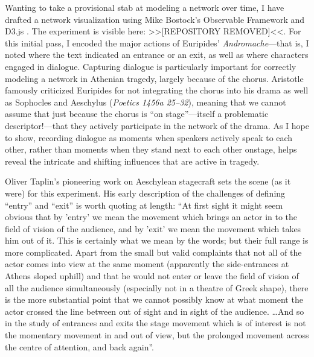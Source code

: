 \documentclass{jcls}
\begin{document}
Wanting to take a provisional stab at modeling a network over time, I
have drafted a network visualization using Mike Bostock's Observable
Framework and D3.js \cite{Observable2025, Bostock2025}. The
experiment is visible here:
>>[REPOSITORY REMOVED]<<.
For this initial pass, I encoded the major actions of Euripides'
\textit{Andromache}---that is, I noted where the text indicated an
entrance or an exit, as well as where characters engaged in dialogue.
Capturing dialogue is particularly important for correctly modeling a
network in Athenian tragedy, largely because of the chorus. Aristotle
famously criticized Euripides for not integrating the chorus into his
drama as well as Sophocles and Aeschylus (\textit{Poetics 1456a
25--32}), meaning that we cannot assume that just because the chorus
is ``on stage''---itself a problematic descriptor!---that they
actively participate in the network of the drama. As I hope to show,
recording dialogue as moments when speakers actively speak to each
other, rather than moments when they stand next to each other
onstage, helps reveal the intricate and shifting influences that are
active in tragedy.

Oliver Taplin's pioneering work on Aeschylean stagecraft sets the
scene (as it were) for this experiment. His early description of the
challenges of defining ``entry'' and ``exit'' is worth quoting at length:
``At first sight it might seem obvious that by 'entry' we mean the
movement which brings an actor in to the field of vision of the
audience, and by 'exit' we mean the movement which takes him out of
it. This is certainly what we mean by the words; but their full range
is more complicated. Apart from the small but valid complaints that
not all of the actor comes into view at the same moment (apparently
the side-entrances at Athens sloped uphill) and that he would not
enter or leave the field of vision of all the audience simultaneously
(especially not in a theatre of Greek shape), there is the more
substantial point that we cannot possibly know at what moment the
actor crossed the line between out of sight and in sight of the
audience. \ldots And so in the study of entrances and exits the stage
movement which is of interest is not the momentary movement in and
out of view, but the prolonged movement across the centre of
attention, and back again''\cite[7]{Taplin1977}.
\end{document}

